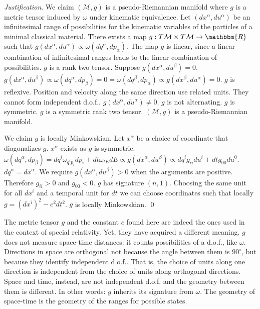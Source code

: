 \documentclass[aps,pra,10pt,twocolumn,floatfix,nofootinbib]{revtex4-1}
\numberwithin{equation}{section}
\theoremstyle{definition}
\newenvironment{justification}{\emph{Justification}.}{\qed}
\begin{document}
\begin{justification}
	We claim $(\mathcal{M}, g)$ is a pseudo-Riemannian manifold where $g$ is a metric tensor induced by $\omega$ under kinematic equivalence. Let $(dx^\alpha, du^\alpha)$ be an infinitesimal range of possibilities for the kinematic variables of the particles of a minimal classical material. There exists a map $g : T\mathcal{M} \times T\mathcal{M} \rightarrow \mathbbm{R}$ such that $g(dx^\alpha, du^\alpha) \propto \omega(dq^\alpha, dp_\alpha)$. The map $g$ is linear, since a linear combination of infinitesimal ranges leads to the linear combination of possibilities. $g$ is a rank two tensor. Suppose $g(dx^\alpha, du^\beta) = 0$. $g(dx^\alpha, du^\beta) \propto \omega(dq^\alpha, dp_\beta) = 0 = \omega(dq^\beta, dp_\alpha) \propto g(dx^\beta, du^\alpha) = 0$. $g$ is reflexive. Position and velocity along the same direction use related units. They cannot form independent d.o.f.. $g(dx^\alpha, du^\alpha) \neq 0$. $g$ is not alternating. $g$ is symmetric. $g$ is a symmetric rank two tensor. $(\mathcal{M}, g)$ is a pseudo-Riemannian manifold.
	
	We claim $g$ is locally Minkowskian. Let $x^\alpha$ be a choice of coordinate that diagonalizes $g$. $x^\alpha$ exists as $g$ is symmetric. $\omega(dq^\alpha, dp_\beta) = dq^i \omega_{q^ip_i} dp_i + dt \omega_{tE} dE \propto g(dx^\alpha, du^\beta) \propto dq^i g_{ii} du^i + dt g_{00} du^0$. $dq^\alpha = dx^\alpha$. We require $g(dx^\alpha, du^\beta)>0$ when the arguments are positive. Therefore $g_{ii} > 0$ and $g_{00} < 0$. $g$ has signature $(n, 1)$. Choosing the same unit for all $dx^i$ and a temporal unit for $dt$ we can choose coordinates such that locally $g = (dx^i)^2 - c^2 dt^2$. $g$ is locally Minkowskian.
\end{justification}

The metric tensor $g$ and the constant $c$ found here are indeed the ones used in the context of special relativity. Yet, they have acquired a different meaning. $g$ does not measure space-time distances: it counts possibilities of a d.o.f., like $\omega$. Directions in space are orthogonal not because the angle between them is $90^\circ$, but because they identify independent d.o.f.. That is, the choice of units along one direction is independent from the choice of units along orthogonal directions. Space and time, instead, are not independent d.o.f. and the geometry between them is different. In other words: $g$ inherits its signature from $\omega$. The geometry of space-time is the geometry of the ranges for possible states.
\end{document}
